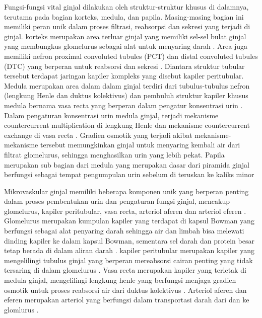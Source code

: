 \noindent Fungsi-fungsi vital ginjal dilakukan oleh struktur-struktur khusus di dalamnya, terutama pada bagian korteks, medula, dan papila. Masing-masing bagian ini memiliki peran unik dalam proses filtrasi, reabsorpsi dan sekresi yang terjadi di ginjal. korteks merupakan area terluar ginjal yang memiliki sel-sel bulat ginjal yang membungkus glomelurus sebagai alat untuk menyaring darah \cite{gopalan_renal_2022}. Area juga memiliki nefron proximal convoluted tubules (PCT) dan distal convoluted tubules (DTC) yang berperan untuk reabsorsi dan sekresi \cite{mescher_junqueiras_2021}. Diantara struktur tubular tersebut terdapat jaringan kapiler kompleks yang disebut kapiler peritubular.  Medula merupakan area dalam dalam ginjal terdiri dari tubulus-tubulus nefron (lengkung Henle dan duktus kolektivus) dan pembuluh struktur kapiler khusus medula bernama vasa recta yang berperan dalam pengatur konsentrasi urin \cite{haug_multi-omic_2022}. Dalam pengaturan konsentrasi urin medula ginjal, terjadi mekanisme countercurrent multiplication di lengkung Henle dan mekanisme countercurrent exchange di vasa recta \cite{nankivell_importance_2020}. Gradien osmotik yang terjadi akibat mekanisme-mekanisme tersebut memungkinkan ginjal untuk menyaring kembali air dari filtrat glomelurus, sehingga menghasilkan urin yang lebih pekat. Papila merupakan sub bagian dari medula yang merupakan dasar dari piramida ginjal berfungsi sebagai tempat pengumpulan urin sebelum di teruskan ke kaliks minor \cite{sabate_arroyo_relationship_2020}

\noindent Mikrovaskular ginjal memiliki beberapa komponen unik yang berperan penting dalam proses pembentukan urin dan pengaturan fungsi ginjal, mencakup glomelurus, kapiler peritubular, vasa recta, arteriol aferen dan arteriol eferen \cite{mescher_junqueiras_2021}. Glomelurus merupakan kumpulan kapiler yang terdapat di kapsul Bowman yang berfungsi sebagai alat penyaring darah sehingga air dan limbah bisa melewati dinding kapiler ke dalam kapsul Bowman, sementara sel darah dan protein besar tetap berada di dalam aliran darah \cite{luxen_unique_2023}. kapiler peritubular merupakan kapiler yang mengelilingi tubulus ginjal yang berperan mereabsorsi cairan penting yang tidak tersaring di dalam glomelurus \cite{savedchuk_targeting_2023}. Vasa recta merupakan kapiler yang terletak di medula ginjal, mengelilingi  lengkung henle yang berfungsi menjaga gradien osmotik untuk proses reabsorsi air dari duktus kolektivus \cite{goligorsky_emerging_2022}. Arteriol aferen dan eferen merupakan arteriol  yang berfungsi dalam transportasi darah dari dan ke glomlurus \cite{ergin_kidney_2021}.


